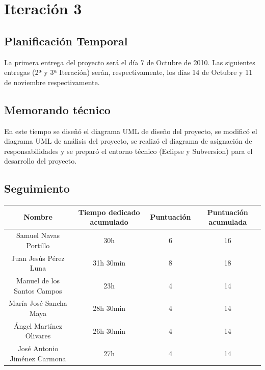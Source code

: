 \documentclass[11 pt]{book}
\begin{document}
\chapter{Iteración 3}
	\section{Planificación Temporal}
		La primera entrega del proyecto será el día 7 de Octubre de 2010. Las siguientes entregas (2ª y 3ª Iteración) serán, respectivamente, los días 14 de Octubre y 11 de noviembre respectivamente.

	\section{Memorando técnico}
		En este tiempo se diseñó el diagrama UML de diseño del proyecto, se modificó el diagrama UML de análisis del proyecto, se realizó el diagrama de asignación de responsabilidades y se preparó el entorno técnico (Eclipse y Subversion) para el desarrollo del proyecto.
		
	\section{Seguimiento}
		\begin{tabular}{|c|c|c|c|}
			\hline
			Nombre & Tiempo dedicado acumulado & Puntuación & Puntuación acumulada\\
			\hline
			Samuel Navas Portillo & 30h & 6 & 16\\
			Juan Jesús Pérez Luna & 31h 30min & 8 & 18\\
			Manuel de los Santos Campos & 23h & 4 & 14\\
			María José Sancha Maya & 28h 30min & 4 & 14\\
			Ángel Martínez Olivares & 26h 30min & 4 & 14\\
			José Antonio Jiménez Carmona & 27h & 4 & 14\\
			\hline
		\end{tabular}
\end{document}
